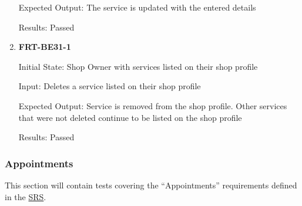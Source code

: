 \documentclass[12pt, titlepage]{article}
\begin{document}
\begin{enumerate}
	      Expected Output: The service is updated with the entered details

	      Results: Passed

	\item \textbf{FRT-BE31-1}

	      Initial State: Shop Owner with services listed on their shop profile

	      Input: Deletes a service listed on their shop profile

	      Expected Output: Service is removed from the shop profile. Other services that were not deleted
	      continue to be listed on the shop profile

	      Results: Passed

\end{enumerate}

\subsubsection{Appointments}

This section will contain tests covering the ``Appointments'' requirements defined in the
\href{https://github.com/arkinmodi/project-sayyara/blob/main/docs/SRS/SRS.pdf}{SRS}.
\end{document}
